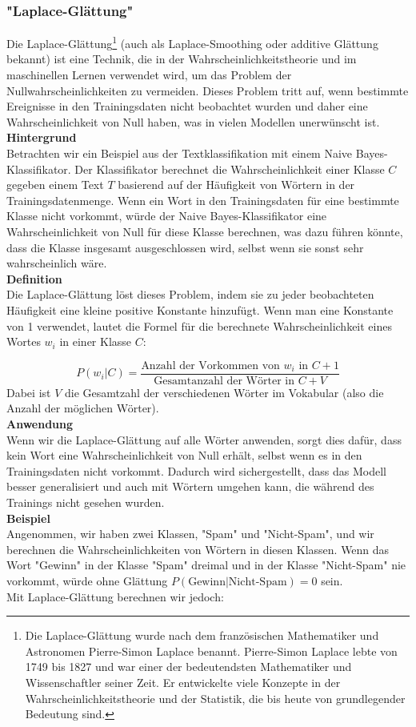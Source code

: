 \documentclass[12pt]{article}
\begin{document}
\subsubsection{"Laplace-Glättung"}
Die Laplace-Glättung\footnote{Die Laplace-Glättung wurde nach dem französischen Mathematiker und Astronomen Pierre-Simon Laplace benannt. Pierre-Simon Laplace lebte von 1749 bis 1827 und war einer der bedeutendsten Mathematiker und Wissenschaftler seiner Zeit. Er entwickelte viele Konzepte in der Wahrscheinlichkeitstheorie und der Statistik, die bis heute von grundlegender Bedeutung sind.} (auch als Laplace-Smoothing oder additive Glättung bekannt) ist eine Technik, die in der Wahrscheinlichkeitstheorie und im maschinellen Lernen verwendet wird, um das Problem der Nullwahrscheinlichkeiten zu vermeiden. Dieses Problem tritt auf, wenn bestimmte Ereignisse in den Trainingsdaten nicht beobachtet wurden und daher eine Wahrscheinlichkeit von Null haben, was in vielen Modellen unerwünscht ist.\\
%
\textbf{Hintergrund}\\
Betrachten wir ein Beispiel aus der Textklassifikation mit einem Naive Bayes-Klassifikator. Der Klassifikator berechnet die Wahrscheinlichkeit einer Klasse \(C\) gegeben einem Text \(T\) basierend auf der Häufigkeit von Wörtern in der Trainingsdatenmenge. Wenn ein Wort in den Trainingsdaten für eine bestimmte Klasse nicht vorkommt, würde der Naive Bayes-Klassifikator eine Wahrscheinlichkeit von Null für diese Klasse berechnen, was dazu führen könnte, dass die Klasse insgesamt ausgeschlossen wird, selbst wenn sie sonst sehr wahrscheinlich wäre.\\
%
\textbf{Definition}\\
Die Laplace-Glättung löst dieses Problem, indem sie zu jeder beobachteten Häufigkeit eine kleine positive Konstante hinzufügt. Wenn man eine Konstante von 1 verwendet, lautet die Formel für die berechnete Wahrscheinlichkeit eines Wortes \( w_i \) in einer Klasse \( C \):

\[
P(w_i|C) = \frac{\text{Anzahl der Vorkommen von } w_i \text{ in } C + 1}{\text{Gesamtanzahl der Wörter in } C + V}
\]
Dabei ist \( V \) die Gesamtzahl der verschiedenen Wörter im Vokabular (also die Anzahl der möglichen Wörter).\\
%
\textbf{Anwendung}\\
%
Wenn wir die Laplace-Glättung auf alle Wörter anwenden, sorgt dies dafür, dass kein Wort eine Wahrscheinlichkeit von Null erhält, selbst wenn es in den Trainingsdaten nicht vorkommt. Dadurch wird sichergestellt, dass das Modell besser generalisiert und auch mit Wörtern umgehen kann, die während des Trainings nicht gesehen wurden.\\
%
\textbf{Beispiel}\\
Angenommen, wir haben zwei Klassen, "Spam" und "Nicht-Spam", und wir berechnen die Wahrscheinlichkeiten von Wörtern in diesen Klassen. Wenn das Wort "Gewinn" in der Klasse "Spam" dreimal und in der Klasse "Nicht-Spam" nie vorkommt, würde ohne Glättung \( P(\text{Gewinn}|\text{Nicht-Spam}) = 0 \) sein. \\
Mit Laplace-Glättung berechnen wir jedoch:
\end{document}
